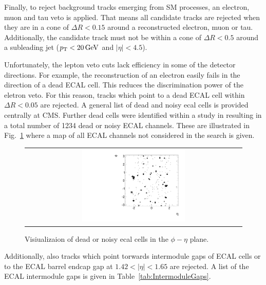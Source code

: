 Finally, to reject background tracks emerging from SM processes, an electron, muon and tau veto is applied.
That means all candidate tracks are rejected when they are in a cone of $\Delta R<0.15$ around a reconstructed electron, muon or tau.
Additionally, the candidate track must not be within a cone of $\Delta R<0.5$ around a subleading jet ($p_{\text{T}}<20\,\text{Ge}\kern-0.06667em\text{V}$ and $|\eta|<4.5$).

Unfortunately, the lepton veto cuts lack efficiency in some of the detector directions.
For example, the reconstruction of an electron easily fails in the direction of a dead ECAL cell.
This reduces the discrimination power of the eletron veto.
For this reason, tracks which point to a dead ECAL cell within $\Delta R < 0.05$  are rejected.
A general list of dead and noisy ecal cells is provided centrally at CMS.
Further dead cells were identified within a study in \cite{bib:CMS:DT_8TeV} resulting in a total number of 1234 dead or noisy ECAL channels. 
These are illustrated in Fig.~\ref{fig:DeadECALmap} where a map of all ECAL channels not considered in the search is given.
\begin{figure}[!t]
  \centering 
  \begin{tabular}{c}
    \includegraphics[width=0.49\textwidth]{figures/analysis/DeadECALMap.pdf}
  \end{tabular}
  \caption{Visiualizaion of dead or noisy ecal cells in the $\phi - \eta$ plane.}
  \label{fig:DeadECALmap}
\end{figure}

Additionally, also tracks which point torwards intermodule gaps of ECAL cells or to the ECAL barrel endcap gap at $1.42<|\eta|<1.65$ are rejected.
A list of the ECAL intermodule gaps is given in Table~\ref{tab:IntermoduleGaps}.
\renewcommand{\arraystretch}{1.5}
\begin{table}[!hbt]
\centering
\caption{Intermodule ECAL gaps.}
\label{tab:IntermoduleGaps}
\end{table}  

